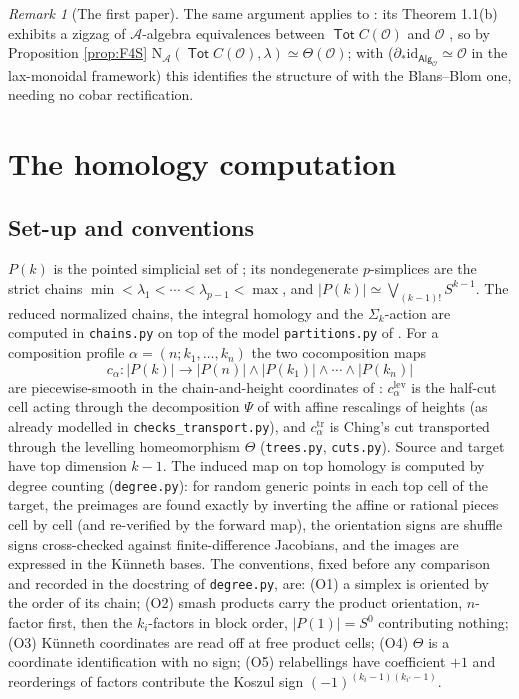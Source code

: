 \documentclass[11pt]{amsart}
\theoremstyle{definition}
\theoremstyle{remark}
\newtheorem{remark}[subsection]{Remark}
\newcommand{\Tot}{\operatorname{\mathsf{Tot}}}
\newcommand{\Alg}{\mathsf{Alg}}
\newcommand{\id}{\mathrm{id}}
\newcommand{\Aop}{\mathcal{A}}
\newcommand{\Lev}{\mathrm{lev}}
\newcommand{\tr}{\mathrm{tr}}
\newcommand{\Nfun}{\mathrm{N}}
\newcommand{\Th}{\Theta}
\begin{document}
\begin{remark}[The first paper]
The same argument applies to \cite{Cl1}: its Theorem 1.1(b) exhibits a zigzag of $\Aop$-algebra equivalences between $\Tot C(\mathcal O)$ and $\mathcal O$ \cite[\S 8.2]{Cl1}, so by Proposition \ref{prop:F4S} $\Nfun_{\Aop}(\Tot C(\mathcal O),\lambda)\simeq\Th(\mathcal O)$; with \cite[Example 3.5]{BH} ($\partial_*\id_{\Alg_{\mathcal O}}\simeq\mathcal O$ in the lax-monoidal framework) this identifies the structure of \cite{Cl1} with the Blans--Blom one, needing no cobar rectification.
\end{remark}

\section{The homology computation}\label{sec:homology}

\subsection{Set-up and conventions}
$P(k)$ is the pointed simplicial set of \cite[Definition 2.4]{Cl2}; its nondegenerate $p$-simplices are the strict chains $\min<\lambda_1<\cdots<\lambda_{p-1}<\max$, and $|P(k)|\simeq\bigvee_{(k-1)!}S^{k-1}$. The reduced normalized chains, the integral homology and the $\Sigma_k$-action are computed in \texttt{chains.py} on top of the model \texttt{partitions.py} of \cite[Appendix C]{Cl2}. For a composition profile $\alpha=(n;k_1,\dots,k_n)$ the two cocomposition maps
\[ c_\alpha\colon |P(k)|\longrightarrow |P(n)|\wedge|P(k_1)|\wedge\cdots\wedge|P(k_n)| \]
are piecewise-smooth in the chain-and-height coordinates of \cite[\S\S A.9, A.21]{Cl2}: $c^{\Lev}_\alpha$ is the half-cut cell acting through the decomposition $\Psi$ of \cite[Lemma 4.4]{Cl2} with affine rescalings of heights (as already modelled in \texttt{checks\_transport.py}), and $c^{\tr}_\alpha$ is Ching's cut \cite[Definition A.31]{Cl2} transported through the levelling homeomorphism $\Theta$ (\texttt{trees.py}, \texttt{cuts.py}). Source and target have top dimension $k-1$. The induced map on top homology is computed by degree counting (\texttt{degree.py}): for random generic points in each top cell of the target, the preimages are found exactly by inverting the affine or rational pieces cell by cell (and re-verified by the forward map), the orientation signs are shuffle signs cross-checked against finite-difference Jacobians, and the images are expressed in the K\"unneth bases. The conventions, fixed before any comparison and recorded in the docstring of \texttt{degree.py}, are: (O1) a simplex is oriented by the order of its chain; (O2) smash products carry the product orientation, $n$-factor first, then the $k_i$-factors in block order, $|P(1)|=S^0$ contributing nothing; (O3) K\"unneth coordinates are read off at free product cells; (O4) $\Theta$ is a coordinate identification with no sign; (O5) relabellings have coefficient $+1$ and reorderings of factors contribute the Koszul sign $(-1)^{(k_i-1)(k_{i'}-1)}$.
\end{document}
